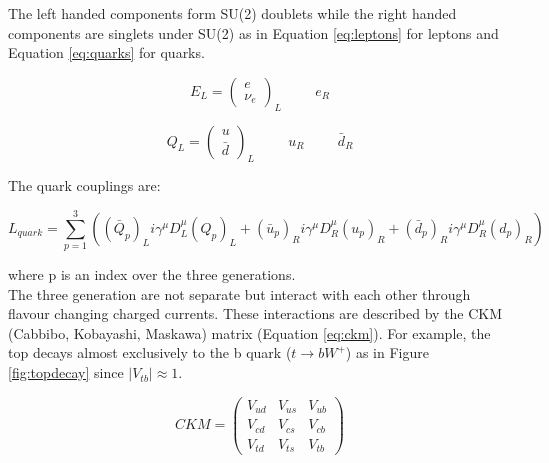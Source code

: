 The left handed components form SU(2) doublets while the right handed components
are singlets under SU(2) as in Equation \ref{eq:leptons} for leptons and
Equation \ref{eq:quarks} for quarks.

\begin{equation}
E_{L} = \left(\begin{array}{c}e\\\nu_{e}\end{array}\right)_{L} \hspace{1cm} e_{R}
\label{eq:leptons}
\end{equation}

\begin{equation}
Q_{L} = \left(\begin{array}{c}u\\\bar{d}\end{array}\right)_{L} \hspace{1cm}
u_{R} \hspace{1cm} \bar{d}_{R}
\label{eq:quarks}
\end{equation}

The quark couplings are:

\begin{equation}
L_{quark} = \displaystyle\sum\limits_{p=1}^3 \left( \left(\bar{Q}_{p}\right)_{L}
i\gamma^{\mu}D_{L}^{\mu} \left(Q_{p}\right)_{L} + \left(\bar{u}_{p}\right)_{R} 
i\gamma^{\mu}D_{R}^{\mu} \left(u_{p}\right)_{R} + \left(\bar{d}_{p}\right)_{R} 
i\gamma^{\mu}D_{R}^{\mu} \left(d_{p}\right)_{R} \right)
\label{eq:yukawa}
\end{equation}

where p is an index over the three generations. \\

The three generation are not separate but interact with each other through
flavour changing charged currents. These interactions are described by the CKM 
(Cabbibo, Kobayashi, Maskawa) matrix (Equation \ref{eq:ckm}). For example, the 
top decays almost exclusively to the b quark ($t\rightarrow bW^{+}$) as in 
Figure \ref{fig:topdecay} since $|V_{tb}| \approx 1$.

\begin{equation}
CKM = \left( 
\begin{array}{ccc}
V_{ud} & V_{us} & V_{ub} \\
V_{cd} & V_{cs} & V_{cb} \\
V_{td} & V_{ts} & V_{tb} 
\end{array} 
\right) 
\label{eq:ckm}
\end{equation}

